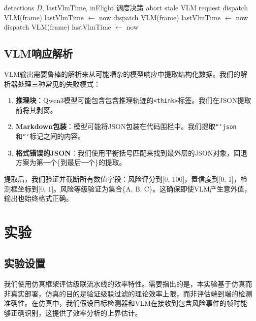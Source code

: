 \documentclass[a4paper,10pt]{ctexart}
\begin{document}
\begin{algorithm}[t]
\caption{基于优先级的VLM调度}
\label{alg:priority}
\begin{algorithmic}[1]
\Require detections $D$, lastVlmTime, inFlight
\Ensure 调度决策
    \State abort stale VLM request
  \EndIf
  \State dispatch VLM(frame)
  \State lastVlmTime $\gets$ now
  \State dispatch VLM(frame)
  \State lastVlmTime $\gets$ now
  \State dispatch VLM(frame)
  \State lastVlmTime $\gets$ now
\EndIf
\end{algorithmic}
\end{algorithm}

\subsection{VLM响应解析}

VLM输出需要鲁棒的解析来从可能嘈杂的模型响应中提取结构化数据。我们的解析器处理三种常见的失败模式：

\begin{enumerate}
\item \textbf{推理块}：Qwen3模型可能包含包含推理轨迹的\texttt{<think>}标签。我们在JSON提取前将其剥离。
\item \textbf{Markdown包装}：模型可能将JSON包装在代码围栏中。我们提取\texttt{```json}和\texttt{```}标记之间的内容。
\item \textbf{格式错误的JSON}：我们使用平衡括号匹配来找到最外层的JSON对象，回退方案为第一个\{到最后一个\}的提取。
\end{enumerate}

提取后，我们验证并截断所有数值字段：风险评分到[0, 100]，置信度到[0, 1]，检测框坐标到[0, 1]。风险等级验证为集合\{A, B, C\}。这确保即使VLM产生意外值，输出也始终格式正确。

\section{实验}

\subsection{实验设置}

我们使用仿真框架评估级联流水线的效率特性。需要指出的是，本实验基于仿真而非真实部署，仿真的目的是验证级联过滤的理论效率上限，而非评估端到端的检测准确性。在仿真中，我们假设目标检测器和VLM在接收到包含风险事件的帧时能够正确识别，这提供了效率分析的上界估计。
\end{document}
